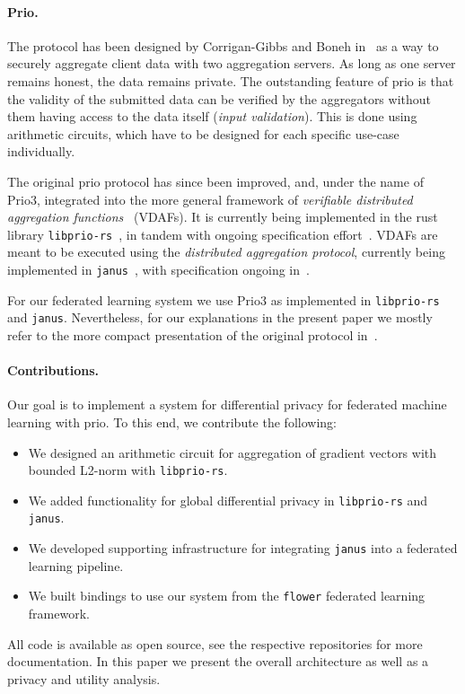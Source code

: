 \documentclass{article}
\begin{document}
\paragraph{Prio.} The protocol has been designed by Corrigan-Gibbs and Boneh in~\cite{prio} as a
way to securely aggregate client data with two aggregation servers. As long as
one server remains honest, the data remains private. The outstanding feature of
prio is that the validity of the submitted data can be verified by the
aggregators without them having access to the data itself (\textit{input
  validation}). This is done using arithmetic circuits, which have to be
designed for each specific use-case individually.

The original prio protocol has since been improved, and, under the name of Prio3, integrated into the
more general framework of \textit{verifiable distributed aggregation
  functions}~\cite{vdaf} (VDAFs). It is currently being implemented in the rust library
\texttt{libprio-rs}~\cite{libprio-rs}, in tandem with ongoing specification effort~\cite{vdaf-draft}.
VDAFs are meant to be executed using the \textit{distributed aggregation
  protocol}, currently being implemented in \texttt{janus}~\cite{janus}, with
specification ongoing in~\cite{dap-draft}.

For our federated learning system we use Prio3
as implemented in \texttt{libprio-rs} and \texttt{janus}. Nevertheless, for our
explanations in the present paper
we mostly refer to the more compact presentation of the original protocol in~\cite{prio}.

\paragraph{Contributions.}
Our goal is to implement a system for differential privacy for federated
machine learning with prio. To this end, we contribute the following:
\begin{itemize}
  \setlength\itemsep{0em}
\item We designed an arithmetic circuit for aggregation of gradient vectors with
  bounded L2-norm with \texttt{libprio-rs}.
\item We added functionality for global differential privacy in
  \texttt{libprio-rs} and \texttt{janus}.
\item We developed supporting infrastructure for integrating \texttt{janus} into
  a federated learning pipeline.
\item We built bindings to use our system from the \texttt{flower} federated
  learning framework.
\end{itemize}
All code is available as open source, see the respective repositories for more
documentation. In this paper we present the overall architecture as well as a
privacy and utility analysis.
\end{document}
